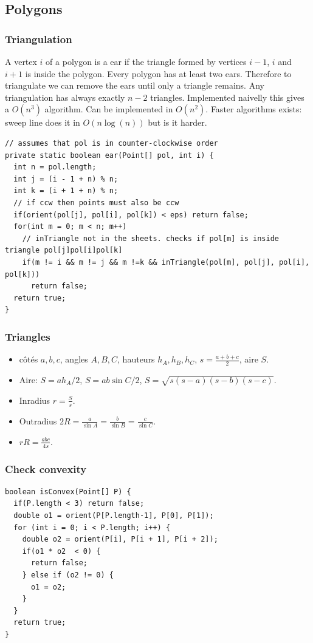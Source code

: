 \subsection{Polygons}

\subsubsection{Triangulation}
A vertex $i$ of a polygon is a ear if the triangle formed by vertices
$i - 1$, $i$ and $i + 1$ is inside the polygon. Every polygon has at
least two ears. Therefore to triangulate we can remove the ears 
until only a triangle remains. Any triangulation has always exactly 
$n - 2$ triangles. Implemented naivelly this gives a $O(n^3)$ algorithm.
Can be implemented in $O(n^2)$. Faster algorithms exists: 
sweep line does it in $O(n \log(n))$ but is it harder.
\begin{lstlisting}
// assumes that pol is in counter-clockwise order
private static boolean ear(Point[] pol, int i) {
  int n = pol.length;
  int j = (i - 1 + n) % n;
  int k = (i + 1 + n) % n;
  // if ccw then points must also be ccw
  if(orient(pol[j], pol[i], pol[k]) < eps) return false;
  for(int m = 0; m < n; m++)
    // inTriangle not in the sheets. checks if pol[m] is inside triangle pol[j]pol[i]pol[k]
    if(m != i && m != j && m !=k && inTriangle(pol[m], pol[j], pol[i], pol[k]))
      return false;
  return true;
}
\end{lstlisting}

\subsubsection{Triangles}
\begin{itemize}
  \item côtés $a,b,c$, angles $A,B,C$, hauteurs $h_A,h_B,h_C$, $s=\frac{a+b+c}{2}$, aire $S$.
  \item Aire: $S=ah_A/2$, $S=ab\sin C/2$, $S=\sqrt{s(s-a)(s-b)(s-c)}$.
  \item Inradius $r=\frac{S}{s}$.
  \item Outradius $2R = \frac{a}{\sin A} = \frac{b}{\sin B} = \frac{c}{\sin C}$.
  \item $rR = \frac{abc}{4s}$.
\end{itemize}

\subsubsection{Check convexity}
\begin{lstlisting}
boolean isConvex(Point[] P) {
  if(P.length < 3) return false;
  double o1 = orient(P[P.length-1], P[0], P[1]);
  for (int i = 0; i < P.length; i++) {
    double o2 = orient(P[i], P[i + 1], P[i + 2]);
    if(o1 * o2  < 0) {
      return false;
    } else if (o2 != 0) {
      o1 = o2;
    }
  }
  return true;
}
\end{lstlisting}

